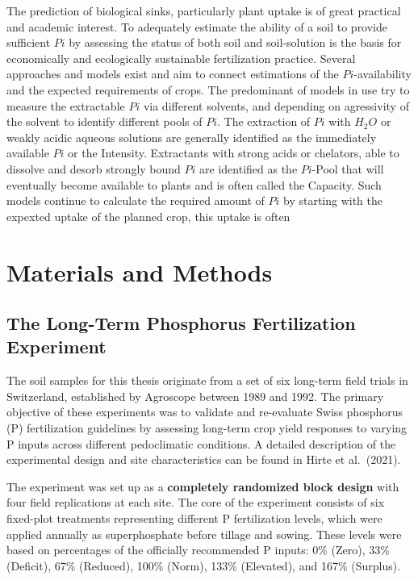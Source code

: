 \documentclass[
  letterpaper,
  DIV=11,
  numbers=noendperiod]{scrartcl}
\begin{document}
The prediction of biological sinks, particularly plant uptake is of
great practical and academic interest. To adequately estimate the
ability of a soil to provide sufficient \(Pi\) by assessing the status
of both soil and soil-solution is the basis for economically and
ecologically sustainable fertilization practice. Several approaches and
models exist and aim to connect estimations of the \(Pi\)-availability
and the expected requirements of crops. The predominant of models in use
try to measure the extractable \(Pi\) via different solvents, and
depending on agressivity of the solvent to identify different pools of
\(Pi\). The extraction of \(Pi\) with \(H_2O\) or weakly acidic aqueous
solutions are generally identified as the immediately available \(Pi\)
or the Intensity. Extractants with strong acids or chelators, able to
dissolve and desorb strongly bound \(Pi\) are identified as the
\(Pi\)-Pool that will eventually become available to plants and is often
called the Capacity. Such models continue to calculate the required
amount of \(Pi\) by starting with the expexted uptake of the planned
crop, this uptake is often

\section{Materials and Methods}\label{materials-and-methods}

\subsection{The Long-Term Phosphorus Fertilization
Experiment}\label{the-long-term-phosphorus-fertilization-experiment}

The soil samples for this thesis originate from a set of six long-term
field trials in Switzerland, established by Agroscope between 1989 and
1992. The primary objective of these experiments was to validate and
re-evaluate Swiss phosphorus (P) fertilization guidelines by assessing
long-term crop yield responses to varying P inputs across different
pedoclimatic conditions. A detailed description of the experimental
design and site characteristics can be found in Hirte et al.~(2021).

The experiment was set up as a \textbf{completely randomized block
design} with four field replications at each site. The core of the
experiment consists of six fixed-plot treatments representing different
P fertilization levels, which were applied annually as superphosphate
before tillage and sowing. These levels were based on percentages of the
officially recommended P inputs: 0\% (Zero), 33\% (Deficit), 67\%
(Reduced), 100\% (Norm), 133\% (Elevated), and 167\% (Surplus).
\end{document}
